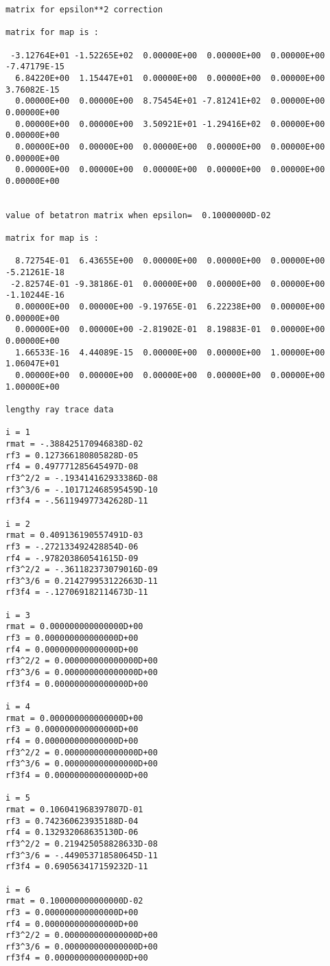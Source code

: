 \begin{footnotesize}
\begin{verbatim}
matrix for epsilon**2 correction

matrix for map is :

 -3.12764E+01 -1.52265E+02  0.00000E+00  0.00000E+00  0.00000E+00  -7.47179E-15
  6.84220E+00  1.15447E+01  0.00000E+00  0.00000E+00  0.00000E+00   3.76082E-15
  0.00000E+00  0.00000E+00  8.75454E+01 -7.81241E+02  0.00000E+00   0.00000E+00
  0.00000E+00  0.00000E+00  3.50921E+01 -1.29416E+02  0.00000E+00   0.00000E+00
  0.00000E+00  0.00000E+00  0.00000E+00  0.00000E+00  0.00000E+00   0.00000E+00
  0.00000E+00  0.00000E+00  0.00000E+00  0.00000E+00  0.00000E+00   0.00000E+00


value of betatron matrix when epsilon=  0.10000000D-02

matrix for map is :

  8.72754E-01  6.43655E+00  0.00000E+00  0.00000E+00  0.00000E+00  -5.21261E-18
 -2.82574E-01 -9.38186E-01  0.00000E+00  0.00000E+00  0.00000E+00  -1.10244E-16
  0.00000E+00  0.00000E+00 -9.19765E-01  6.22238E+00  0.00000E+00   0.00000E+00
  0.00000E+00  0.00000E+00 -2.81902E-01  8.19883E-01  0.00000E+00   0.00000E+00
  1.66533E-16  4.44089E-15  0.00000E+00  0.00000E+00  1.00000E+00   1.06047E+01
  0.00000E+00  0.00000E+00  0.00000E+00  0.00000E+00  0.00000E+00   1.00000E+00

lengthy ray trace data

i = 1
rmat = -.388425170946838D-02
rf3 = 0.127366180805828D-05
rf4 = 0.497771285645497D-08
rf3^2/2 = -.193414162933386D-08
rf3^3/6 = -.101712468595459D-10
rf3f4 = -.561194977342628D-11

i = 2
rmat = 0.409136190557491D-03
rf3 = -.272133492428854D-06
rf4 = -.978203860541615D-09
rf3^2/2 = -.361182373079016D-09
rf3^3/6 = 0.214279953122663D-11
rf3f4 = -.127069182114673D-11

i = 3
rmat = 0.000000000000000D+00
rf3 = 0.000000000000000D+00
rf4 = 0.000000000000000D+00
rf3^2/2 = 0.000000000000000D+00
rf3^3/6 = 0.000000000000000D+00
rf3f4 = 0.000000000000000D+00

i = 4
rmat = 0.000000000000000D+00
rf3 = 0.000000000000000D+00
rf4 = 0.000000000000000D+00
rf3^2/2 = 0.000000000000000D+00
rf3^3/6 = 0.000000000000000D+00
rf3f4 = 0.000000000000000D+00

i = 5
rmat = 0.106041968397807D-01
rf3 = 0.742360623935188D-04
rf4 = 0.132932068635130D-06
rf3^2/2 = 0.219425058828633D-08
rf3^3/6 = -.449053718580645D-11
rf3f4 = 0.690563417159232D-11

i = 6
rmat = 0.100000000000000D-02
rf3 = 0.000000000000000D+00
rf4 = 0.000000000000000D+00
rf3^2/2 = 0.000000000000000D+00
rf3^3/6 = 0.000000000000000D+00
rf3f4 = 0.000000000000000D+00


\end{verbatim}
\end{footnotesize}
